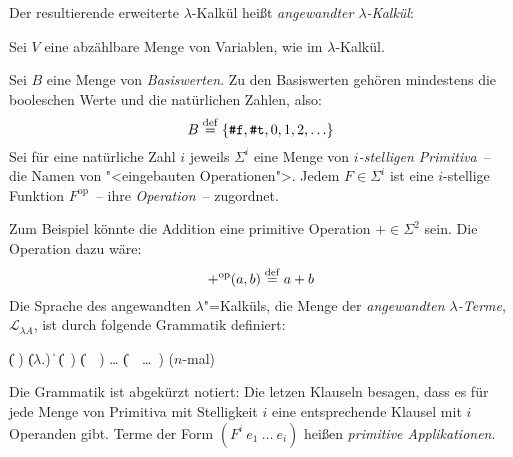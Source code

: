 Der resultierende erweiterte $\lambda$-Kalkül heißt 
\textit{angewandter $\lambda$-Kalkül}:

\begin{definition}\label{def:lambda-angewandt}
  
  Sei $V$ eine abzählbare Menge von Variablen, wie im
  $\lambda$-Kalkül.

  Sei $B$ eine Menge von \textit{Basiswerten}.  Zu
  den Basiswerten gehören mindestens die booleschen Werte und die
  natürlichen Zahlen, also:
  \begin{displaymath}
    B \stackrel{\rm def}{=}{} \{ \texttt{\#f}, \texttt{\#t}, 0, 1, 2, \ldots \}
  \end{displaymath}
  Sei für eine natürliche Zahl $i$ jeweils $\Sigma^i$ eine Menge von
  \textit{$i$-stelligen Primitiva}~-- die Namen von
  "<eingebauten Operationen">.  Jedem $F\in\Sigma^i$ ist eine
  $i$-stellige Funktion $F^{\textrm{op}}$~-- ihre \textit{Operation}~--
  zugordnet.

  Zum Beispiel könnte die Addition eine primitive Operation
  $+\in \Sigma^2$ sein.  Die Operation dazu wäre:
  \begin{displaymath}
    +^{\textrm{op}}(a, b) \stackrel{\rm def}{=} a + b
  \end{displaymath}
  Die Sprache des angewandten
  $\lambda$"=Kalküls, die Menge der \textit{angewandten
    $\lambda$-Terme},
  $\mathcal{L}_{\lambda{}A}$, ist
  durch folgende Grammatik definiert:
  \begin{grammar}
     \: 
    \> \| ( )
    \> \| ($\lambda$.)
    \> \| 
    \> \| (~)
    \> \| (~~)
    \> \ldots
    \> \| (~~\ldots~) \quad \textrm{($n$-mal)}
  \end{grammar}
  Die Grammatik ist abgekürzt notiert: Die letzen Klauseln besagen,
  dass es für jede Menge von Primitiva  mit
  Stelligkeit $i$ eine entsprechende Klausel mit $i$ Operanden gibt.
  Terme der Form $(F^i~e_1~\ldots~e_i)$ heißen
  \textit{primitive Applikationen}.
\end{definition}
